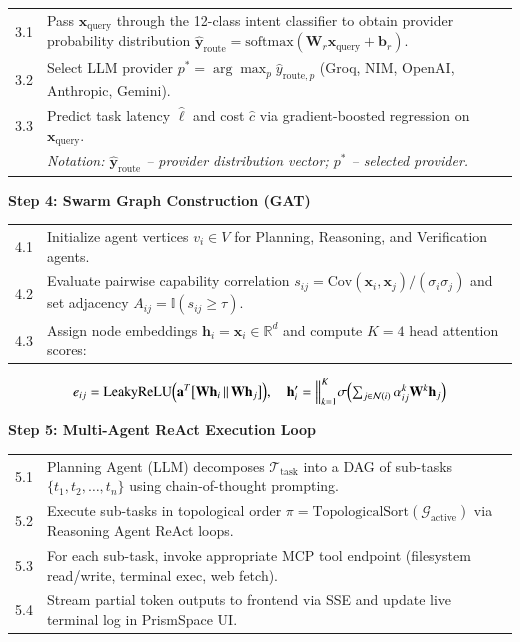 \documentclass[12pt,a4paper]{report}
\begin{document}
\noindent\begin{tabular}{p{1cm} p{12.5cm}}
3.1 & Pass $\mathbf{x}_{\text{query}}$ through the 12-class intent classifier to obtain provider probability distribution $\hat{\mathbf{y}}_{\text{route}} = \mathrm{softmax}(\mathbf{W}_{r}\mathbf{x}_{\text{query}} + \mathbf{b}_r)$. \\
3.2 & Select LLM provider $p^* = \arg\max_p \hat{y}_{\text{route},p}$ (Groq, NIM, OpenAI, Anthropic, Gemini). \\
3.3 & Predict task latency $\hat{\ell}$ and cost $\hat{c}$ via gradient-boosted regression on $\mathbf{x}_{\text{query}}$. \\
 & \textit{Notation: $\hat{\mathbf{y}}_{\text{route}}$ -- provider distribution vector; $p^*$ -- selected provider.} \\
\end{tabular}

\vspace{8pt}
\noindent\textbf{Step 4: Swarm Graph Construction (GAT)}
\vspace{4pt}

\noindent\begin{tabular}{p{1cm} p{12.5cm}}
4.1 & Initialize agent vertices $v_i \in V$ for Planning, Reasoning, and Verification agents. \\
4.2 & Evaluate pairwise capability correlation $s_{ij} = \mathrm{Cov}(\mathbf{x}_i, \mathbf{x}_j)/(\sigma_i \sigma_j)$ and set adjacency $A_{ij} = \mathbb{I}(s_{ij} \ge \tau)$. \\
4.3 & Assign node embeddings $\mathbf{h}_i = \mathbf{x}_i \in \mathbb{R}^d$ and compute $K{=}4$ head attention scores: \\
\end{tabular}
\begin{equation}
    e_{ij} = \mathrm{LeakyReLU}\Big(\mathbf{a}^T \big[\mathbf{W}\mathbf{h}_i \,\Vert\, \mathbf{W}\mathbf{h}_j\big]\Big), \quad
    \mathbf{h}_i' = \Bigl\Vert_{k=1}^K \sigma\Bigl(\textstyle\sum_{j \in \mathcal{N}(i)} \alpha_{ij}^k \mathbf{W}^k \mathbf{h}_j\Bigr)
\end{equation}

\clearpage
\noindent\textbf{Step 5: Multi-Agent ReAct Execution Loop}
\vspace{4pt}

\noindent\begin{tabular}{p{1cm} p{12.5cm}}
5.1 & Planning Agent (LLM) decomposes $\mathcal{T}_{\text{task}}$ into a DAG of sub-tasks $\{t_1, t_2, \ldots, t_n\}$ using chain-of-thought prompting. \\
5.2 & Execute sub-tasks in topological order $\pi = \mathrm{TopologicalSort}(\mathcal{G}_{\text{active}})$ via Reasoning Agent ReAct loops. \\
5.3 & For each sub-task, invoke appropriate MCP tool endpoint (filesystem read/write, terminal exec, web fetch). \\
5.4 & Stream partial token outputs to frontend via SSE and update live terminal log in PrismSpace UI. \\
\end{tabular}
\end{document}

